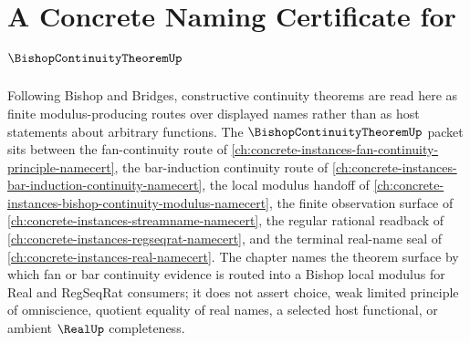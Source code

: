 \chapter{A Concrete Naming Certificate for $\BishopContinuityTheoremUp$}
\label{ch:concrete-instances-bishop-continuity-theorem-namecert}

Following Bishop and Bridges, constructive continuity theorems are read here as finite modulus-producing routes over displayed names rather than as host statements about arbitrary functions. The $\BishopContinuityTheoremUp$ packet sits between the fan-continuity route of \autoref{ch:concrete-instances-fan-continuity-principle-namecert}, the bar-induction continuity route of \autoref{ch:concrete-instances-bar-induction-continuity-namecert}, the local modulus handoff of \autoref{ch:concrete-instances-bishop-continuity-modulus-namecert}, the finite observation surface of \autoref{ch:concrete-instances-streamname-namecert}, the regular rational readback of \autoref{ch:concrete-instances-regseqrat-namecert}, and the terminal real-name seal of \autoref{ch:concrete-instances-real-namecert}. The chapter names the theorem surface by which fan or bar continuity evidence is routed into a Bishop local modulus for Real and RegSeqRat consumers; it does not assert choice, weak limited principle of omniscience, quotient equality of real names, a selected host functional, or ambient $\RealUp$ completeness.

